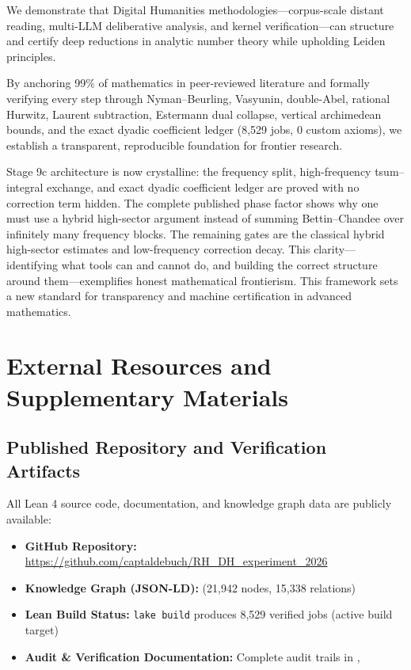 \documentclass[11pt,a4paper]{article}
\theoremstyle{plain}
\theoremstyle{definition}
\theoremstyle{remark}
\begin{document}
We demonstrate that Digital Humanities methodologies---corpus-scale distant reading, multi-LLM deliberative analysis, and kernel verification---can structure and certify deep reductions in analytic number theory while upholding Leiden principles.

By anchoring 99\% of mathematics in peer-reviewed literature and formally verifying every step through Nyman--Beurling, Vasyunin, double-Abel, rational Hurwitz, Laurent subtraction, Estermann dual collapse, vertical archimedean bounds, and the exact dyadic coefficient ledger (8,529 jobs, 0 custom axioms), we establish a transparent, reproducible foundation for frontier research.

Stage 9c architecture is now crystalline: the frequency split, high-frequency tsum--integral exchange, and exact dyadic coefficient ledger are proved with no correction term hidden. The complete published phase factor shows why one must use a hybrid high-sector argument instead of summing Bettin--Chandee over infinitely many frequency blocks. The remaining gates are the classical hybrid high-sector estimates and low-frequency correction decay. This clarity---identifying what tools can and cannot do, and building the correct structure around them---exemplifies honest mathematical frontierism. This framework sets a new standard for transparency and machine certification in advanced mathematics.

\section{External Resources and Supplementary Materials}
\label{sec:resources}

\subsection{Published Repository and Verification Artifacts}

All Lean 4 source code, documentation, and knowledge graph data are publicly available:

\begin{itemize}[leftmargin=2em]
  \item \textbf{GitHub Repository:} \url{https://github.com/captaldebuch/RH_DH_experiment_2026}
  \item \textbf{Knowledge Graph (JSON-LD):}  (21,942 nodes, 15,338 relations)
  \item \textbf{Lean Build Status:} \texttt{lake build} produces 8,529 verified jobs (active build target)
  \item \textbf{Audit & Verification Documentation:} Complete audit trails in , 
\end{itemize}
\end{document}
